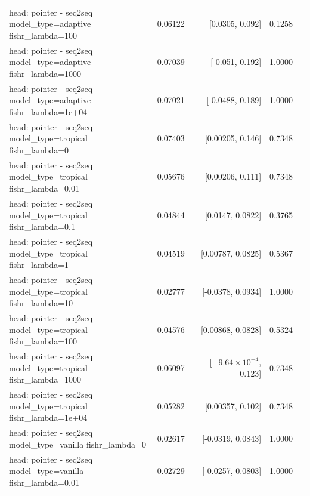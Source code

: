\documentclass[10pt]{article}
\makeatletter
\newcommand{\stackcell}[1]{\begin{tabular}[t]{@{}l@{}}#1\end{tabular}}
\makeatother
\begin{document}
{\begin{longtable}{lrrrl}
\stackcell{head: pointer - seq2seq\\\footnotesize model\_type=adaptive fishr\_lambda=100 } & 0.06122 & [0.0305, 0.092] & 0.1258 & \\
\stackcell{head: pointer - seq2seq\\\footnotesize model\_type=adaptive fishr\_lambda=1000 } & 0.07039 & [-0.051, 0.192] & 1.0000 & \\
\stackcell{head: pointer - seq2seq\\\footnotesize model\_type=adaptive fishr\_lambda=1e+04 } & 0.07021 & [-0.0488, 0.189] & 1.0000 & \\
\stackcell{head: pointer - seq2seq\\\footnotesize model\_type=tropical fishr\_lambda=0 } & 0.07403 & [0.00205, 0.146] & 0.7348 & \\
\stackcell{head: pointer - seq2seq\\\footnotesize model\_type=tropical fishr\_lambda=0.01 } & 0.05676 & [0.00206, 0.111] & 0.7348 & \\
\stackcell{head: pointer - seq2seq\\\footnotesize model\_type=tropical fishr\_lambda=0.1 } & 0.04844 & [0.0147, 0.0822] & 0.3765 & \\
\stackcell{head: pointer - seq2seq\\\footnotesize model\_type=tropical fishr\_lambda=1 } & 0.04519 & [0.00787, 0.0825] & 0.5367 & \\
\stackcell{head: pointer - seq2seq\\\footnotesize model\_type=tropical fishr\_lambda=10 } & 0.02777 & [-0.0378, 0.0934] & 1.0000 & \\
\stackcell{head: pointer - seq2seq\\\footnotesize model\_type=tropical fishr\_lambda=100 } & 0.04576 & [0.00868, 0.0828] & 0.5324 & \\
\stackcell{head: pointer - seq2seq\\\footnotesize model\_type=tropical fishr\_lambda=1000 } & 0.06097 & [$-9.64\times10^{-4}$, 0.123] & 0.7348 & \\
\stackcell{head: pointer - seq2seq\\\footnotesize model\_type=tropical fishr\_lambda=1e+04 } & 0.05282 & [0.00357, 0.102] & 0.7348 & \\
\stackcell{head: pointer - seq2seq\\\footnotesize model\_type=vanilla fishr\_lambda=0 } & 0.02617 & [-0.0319, 0.0843] & 1.0000 & \\
\stackcell{head: pointer - seq2seq\\\footnotesize model\_type=vanilla fishr\_lambda=0.01 } & 0.02729 & [-0.0257, 0.0803] & 1.0000 & \\

\end{longtable}}
\end{document}
